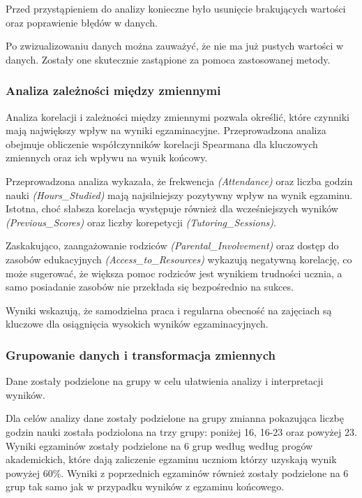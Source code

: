 \documentclass[
]{article}
\begin{document}
Przed przystąpieniem do analizy konieczne było usunięcie brakujących
wartości oraz poprawienie błędów w danych.

Po zwizualizowaniu danych można zauważyć, że nie ma już pustych wartości
w danych. Zostały one skutecznie zastąpione za pomoca zastosowanej
metody.

\subsubsection{Analiza zależności między
zmiennymi}\label{analiza-zaleux17cnoux15bci-miux119dzy-zmiennymi}

Analiza korelacji i zależności między zmiennymi pozwala określić, które
czynniki mają największy wpływ na wyniki egzaminacyjne. Przeprowadzona
analiza obejmuje obliczenie współczynników korelacji Spearmana dla
kluczowych zmiennych oraz ich wpływu na wynik końcowy.

Przeprowadzona analiza wykazała, że frekwencja \emph{(Attendance)} oraz
liczba godzin nauki \emph{(Hours\_Studied)} mają najsilniejszy pozytywny
wpływ na wynik egzaminu. Istotna, choć słabsza korelacja występuje
również dla wcześniejszych wyników \emph{(Previous\_Scores)} oraz liczby
korepetycji \emph{(Tutoring\_Sessions)}.

Zaskakująco, zaangażowanie rodziców \emph{(Parental\_Involvement)} oraz
dostęp do zasobów edukacyjnych \emph{(Access\_to\_Resources)} wykazują
negatywną korelację, co może sugerować, że większa pomoc rodziców jest
wynikiem trudności ucznia, a samo posiadanie zasobów nie przekłada się
bezpośrednio na sukces.

Wyniki wskazują, że samodzielna praca i regularna obecność na zajęciach
są kluczowe dla osiągnięcia wysokich wyników egzaminacyjnych.

\subsubsection{Grupowanie danych i transformacja
zmiennych}\label{grupowanie-danych-i-transformacja-zmiennych}

Dane zostały podzielone na grupy w celu ułatwienia analizy i
interpretacji wyników.

Dla celów analizy dane zostały podzielone na grupy zmianna pokazująca
liczbę godzin nauki została podziolona na trzy grupy: poniżej 16, 16-23
oraz powyżej 23. Wyniki egzaminów zostały podzielone na 6 grup według
według progów akademickich, które dają zaliczenie egzaminu uczniom
którzy uzyskają wynik powyżej 60\%. Wyniki z poprzednich egzaminów
również zostały podzielone na 6 grup tak samo jak w przypadku wyników z
egzaminu końcowego.
\end{document}
